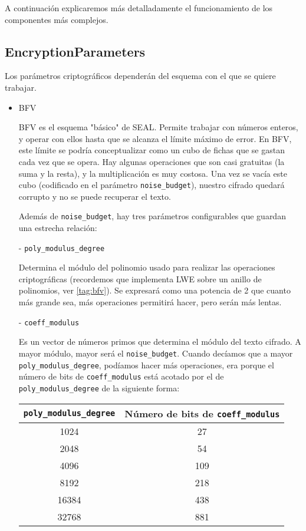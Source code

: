A continuación explicaremos más detalladamente el funcionamiento de los componentes más complejos.

\subsection{EncryptionParameters}

Los parámetros criptográficos dependerán del esquema con el que se quiere trabajar.

\begin{itemize}

  \item BFV

  BFV es el esquema "básico" de SEAL. Permite trabajar con números enteros, y operar con ellos hasta que se alcanza el límite máximo de error. En BFV, este límite se podría conceptualizar como un cubo de fichas que se gastan cada vez que se opera. Hay algunas operaciones que son casi gratuitas (la suma y la resta), y la multiplicación es muy costosa. Una vez se vacía este cubo (codificado en el parámetro \verb|noise_budget|), nuestro cifrado quedará corrupto y no se puede recuperar el texto.

  Además de \verb|noise_budget|, hay tres parámetros configurables que guardan una estrecha relación:

  - \verb|poly_modulus_degree|

  Determina el módulo del polinomio usado para realizar las operaciones criptográficas (recordemos que implementa LWE sobre un anillo de polinomios, ver \ref{tag:bfv}). Se expresará como una potencia de 2 que cuanto más grande sea, más operaciones permitirá hacer, pero serán más lentas.

  - \verb|coeff_modulus|

  Es un vector de números primos que determina el módulo del texto cifrado. A mayor módulo, mayor será el \verb|noise_budget|. Cuando decíamos que a mayor \verb|poly_modulus_degree|, podíamos hacer más operaciones, era porque el número de bits de \verb|coeff_modulus| está acotado por el de \verb|poly_modulus_degree| de la siguiente forma:

  \begin{tabular}{ | c | c | }
    \verb|poly_modulus_degree|  & Número de bits de \verb|coeff_modulus| \\
    \hline
    1024  & 27  \\
    2048  & 54  \\
    4096  & 109 \\
    8192  & 218 \\
    16384 & 438 \\
    32768 & 881
  \end{tabular}


\end{itemize}
